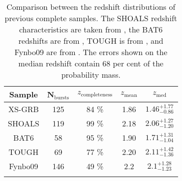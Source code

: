 \begin{table}[H]
	\centering
	\begin{tabular}{ccccc}
		\hline
		\hline\noalign{\smallskip}
		{Sample} & {N$_{\mathrm{bursts}}$} & {$z_{\mathrm{completeness}}$} &  {$z_{\mathrm{mean}}$} &  {$z_{\mathrm{med}}$} \\
		\hline\noalign{\smallskip}
		{\smallskip}
		XS-GRB & 125 & 84 \% & 1.86 & $1.46_{-0.86}^{+1.77}$ \\
		{\smallskip}
		SHOALS  & 119 &  99 \% &  2.18  & $2.06_{-1.20}^{+1.27}$ \\
		{\smallskip}
		BAT6 & 58 & 95 \% &  1.90 &  $1.71_{-1.04}^{+1.31}$ \\
		{\smallskip}
		TOUGH & 69 &  77 \% & 2.20 & $2.11_{-1.36}^{+1.42}$ \\
		{\smallskip}
		Fynbo09 & 146 &  49 \% &  2.2 & $2.1_{-1.23}^{+1.28}$ \\
		\hline\noalign{\smallskip}

\end{tabular} 

\caption{Comparison between the redshift distributions of previous complete
	samples. The SHOALS redshift characteristics are taken from \citet{Perley2016a},
	the BAT6 redshifts are from \citet{Salvaterra2012}, TOUGH is from
	\cite{Hjorth2012}, and Fynbo09 are from \citet{Fynbo2009}. The errors shown on
	the median redshift contain 68 per cent of the probability mass.
	\label{tab:redshift_comparison}}



\end{table}